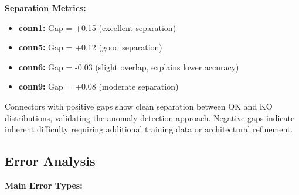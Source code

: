 \documentclass[11pt,a4paper,draft]{article}
\begin{document}
\textbf{Separation Metrics:}
\begin{itemize}
    \item \textbf{conn1:} Gap = +0.15 (excellent separation)
    \item \textbf{conn5:} Gap = +0.12 (good separation)
    \item \textbf{conn6:} Gap = -0.03 (slight overlap, explains lower accuracy)
    \item \textbf{conn9:} Gap = +0.08 (moderate separation)
\end{itemize}

Connectors with positive gaps show clean separation between OK and KO distributions, validating the anomaly detection approach. Negative gaps indicate inherent difficulty requiring additional training data or architectural refinement.

\subsection{Error Analysis}

\textbf{Main Error Types:}
\end{document}
